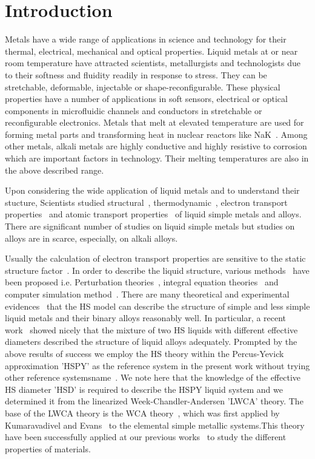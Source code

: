 \documentclass[final12pt]{elsarticle}
\begin{document}
\section{Introduction}

Metals have a wide range of applications in science and technology for their thermal, electrical, mechanical and optical properties. Liquid metals at or near room temperature have attracted scientists, metallurgists and technologists due to their softness and fluidity readily in response to stress. They can be stretchable, deformable, injectable or shape-reconfigurable. These physical properties have a number of applications in soft sensors, electrical or optical components in microfluidic channels and conductors in stretchable or reconfigurable electronics. Metals that melt at elevated temperature are used for forming metal parts and transforming heat in nuclear reactors like NaK~\cite{Dickey2014}. Among other metals, alkali metals are highly conductive and highly resistive to corrosion which are important factors in technology. Their melting temperatures are also in the above described range.

Upon considering the wide application of liquid metals and to understand their stucture, Scientists studied structural~\cite{Bhuiyan1996}, thermodynamic~\cite{Bhuiyan2000,Zahid1999}, electron transport properties~\cite{Sharmin2002} and  atomic transport properties~\cite{Bhuiyan2003,Gosh2013,Bhuiyan2008} of liquid simple metals and alloys. There are significant number of studies on liquid simple metals but studies on alloys are in scarce, especially, on alkali alloys.

Usually the calculation of electron transport properties are sensitive to the static structure factor~\cite{Leavens1981,Nardi1996}. In order to describe the liquid structure, various methods~\cite{Hansen1976} have been proposed i.e. Perturbation theories~\cite{Week1971,Ishihara1968,Barkar1967}, integral equation theories~\cite{Bhuiyan1993} and computer simulation method~\cite{McGreevey1991}. There are many theoretical and experimental evidences~\cite{Waseda,Shimoji39} that the HS model can describe the structure of simple and less simple liquid metals and their binary alloys reasonably well. In particular, a recent work~\cite{Khaleque2002} showed nicely that the mixture of two HS liquids with different effective diameters described the structure of liquid alloys adequately. Prompted by the above results of success we employ the HS theory within the Percus-Yevick approximation 'HSPY' as the reference system in the present work without trying other reference systems{name}~\cite{Ross40,Hafner41}. We note here that the knowledge of the effective HS diameter 'HSD' is required to describe the HSPY liquid system and we determined it from the linearized Week-Chandler-Andersen 'LWCA' theory. The base of the LWCA theory is the WCA theory~\cite{Mayer1980}, which was first applied by Kumaravadivel and Evans~\cite{Kumar23} to the elemental simple metallic systems.This theory have been successfully applied at our previous works~\cite{Gosh2007,Bhuiyan2003} to study the different properties of materials.
\end{document}
